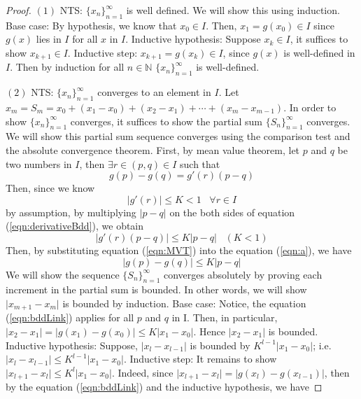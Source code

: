 \documentclass{article}
\theoremstyle{definition}
\theoremstyle{remark}
\theoremstyle{example}
\begin{document}
\begin{proof}
    \cite{r_kent_nagle_fundamentals_2011}$(1)$ NTS: $\{x_n\}_{n = 1}^{\infty}$ is well defined. \; We will show this using induction. Base case: By hypothesis, we know that $x_0 \in I$. Then, $x_1 = g(x_0) \in I$ since $g(x)$ lies in $I$ for all $x$ in $I$. Inductive hypothesis: Suppose $x_k \in I$, it suffices to show $x_{k+1} \in I$. Inductive step: $x_{k+1} = g(x_k) \in I$, since $g(x)$ is well-defined in $I$. Then by induction for all $n \in \mathbb{N}$ $\{x_n\}_{n = 1}^{\infty}$ is well-defined.
    
    $(2)$ NTS: $\{x_n\}_{n = 1}^{\infty}$ converges to an element in $I$. \; Let $x_m = S_m = x_0 + (x_1 - x_0) + (x_2 - x_1) + \cdots + (x_m - x_{m-1})$. In order to show $\{x_n\}_{n = 1}^{\infty}$ converges, it suffices to show the partial sum $\{S_n\}_{n = 1}^{\infty}$ converges. We will show this partial sum sequence converges using the comparison test and the absolute convergence theorem. First, by mean value theorem, let $p$ and $q$ be two numbers in $I$, then $\exists r \in (p,q) \in I$ such that
    \begin{equation}\label{eqn:MVT}
        g(p) - g(q) = g'(r)(p - q)
    \end{equation}
    Then, since we know 
    \begin{equation}\label{eqn:derivativeBdd}
        \lvert g'(r) \rvert \leq K < 1 \;\;\; \forall r \in I
    \end{equation}
    by assumption, by multiplying $\lvert p - q \rvert$ on the both sides of equation (\ref{eqn:derivativeBdd}), we obtain 
    \begin{equation}\label{eqn:a}
        \lvert g'(r)(p-q) \rvert \leq K \lvert p - q \rvert \;\;\; (K < 1)
    \end{equation}
    Then, by substituting equation (\ref{eqn:MVT}) into the equation (\ref{eqn:a}), we have 
    \begin{equation}\label{eqn:bddLink}
        \lvert g(p) - g(q) \rvert \leq K \lvert p - q \rvert
    \end{equation}
    We will show the sequence $\{S_n\}_{n = 1}^{\infty}$ converges absolutely by proving each increment in the partial sum is bounded. In other words, we will show $\lvert x_{m+1} - x_{m}\rvert$ is bounded by induction. Base case: Notice, the equation (\ref{eqn:bddLink}) applies for all $p$ and $q$ in I. Then, in particular, $\lvert x_2 - x_1 \rvert = \lvert g(x_1) - g(x_0) \rvert \leq K \lvert x_1 - x_0 \rvert$. Hence $\lvert x_2 - x_1 \rvert$ is bounded. Inductive hypothesis: Suppose, $\lvert x_{l} - x_{l-1} \rvert$ is bounded by $K^{l-1} \rvert x_1 - x_0 \rvert$; i.e. $\lvert x_{l} - x_{l-1} \rvert \leq K^{l-1} \rvert x_1 - x_0 \rvert$. Inductive step: It remains to show $\lvert x_{l+1} - x_{l} \rvert \leq K^{l} \rvert x_1 - x_0 \rvert$. Indeed, since $\rvert x_{l + 1} - x_l \rvert = \lvert g(x_l) - g(x_{l-1}) \rvert$, then by the equation (\ref{eqn:bddLink}) and the inductive hypothesis, we have

\end{proof}
\end{document}
